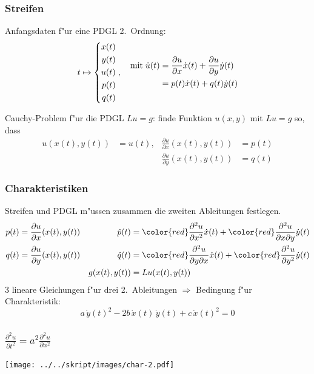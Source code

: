 \documentclass[handout]{beamer}
\begin{document}
\begin{frame}
\frametitle{Streifen}

Anfangsdaten f"ur eine PDGL 2.~Ordnung:
\[
t\mapsto
\left\{
\begin{aligned}
x(t)\\
y(t)\\
u(t)\\
p(t)\\
q(t)
\end{aligned}
\right.
,
\quad
\begin{aligned}
\text{mit\;}
\dot u(t)
&=
\frac{\partial u}{\partial x}\dot x(t) + \frac{\partial u}{\partial y}\dot y(t)\\
&=p(t)\dot x(t)+q(t)\dot y(t)
\end{aligned}
\]

\begin{definition}
Cauchy-Problem f"ur die PDGL $Lu = g$: finde Funktion $u(x,y)$ mit $Lu=g$ so,
dass
\begin{align*}
u(x(t),y(t))&=u(t), &\frac{\partial u}{\partial x}(x(t),y(t))&=p(t)\\
            &       &\frac{\partial u}{\partial y}(x(t),y(t))&=q(t)
\end{align*}
\end{definition}

\end{frame}

\begin{frame}
\frametitle{Charakteristiken}

Streifen und PDGL m"ussen zusammen die zweiten Ableitungen festlegen.
\begin{align*}
p(t)&=\frac{\partial u}{\partial x}(x(t), y(t))
&
\dot p(t)
&={\color{red} \frac{\partial^2 u}{\partial x^2}}\dot x(t)
+
{\color{red}\frac{\partial^2u}{\partial x\partial y}}\dot y(t)
\\
q(t)&=\frac{\partial u}{\partial y}(x(t), y(t))
&
\dot q(t)
&=
{\color{red}\frac{\partial^2 u}{\partial y\partial x}}\dot x(t)
+
{\color{red}\frac{\partial^2u}{\partial y^2}}\dot y(t)
\\
&&g(x(t),y(t))&=Lu (x(t),y(t))
\end{align*}
3 lineare Gleichungen f"ur drei 2.~Ableitungen
$\Rightarrow$
Bedingung f"ur Charakteristik:
\[
a\,\dot y(t)^2-2b\,\dot x(t)\,\dot y(t)+c\,\dot x(t)^2=0
\]
\end{frame}

\begin{frame}
\frametitle{$\displaystyle \frac{\partial^2u}{\partial t^2}=a^2\frac{\partial^2u}{\partial x^2}$}
\pause
\begin{center}
\texttt{[image: ../../skript/images/char-2.pdf]}
\end{center}
\end{frame}
\end{document}
